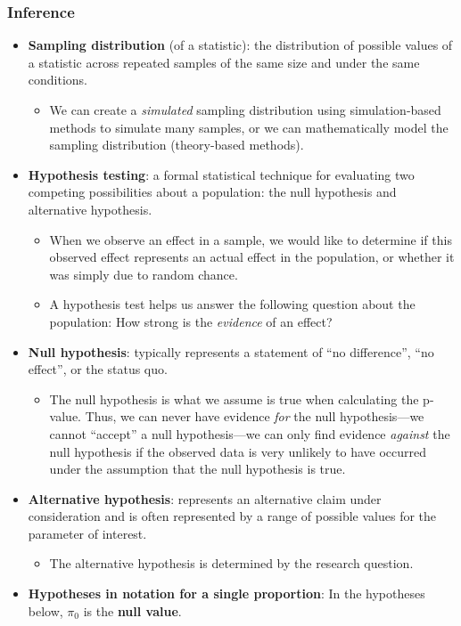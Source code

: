 \documentclass[
]{report}
\providecommand{\tightlist}{%
  \setlength{\itemsep}{0pt}\setlength{\parskip}{0pt}}
\begin{document}
\subsubsection*{Inference}\label{inference}

\begin{itemize}
\item
  \textbf{Sampling distribution} (of a statistic): the distribution of possible values of a statistic across repeated samples of the same size and under the same conditions.

  \begin{itemize}
  \tightlist
  \item
    We can create a \emph{simulated} sampling distribution using simulation-based methods to simulate many samples, or we can mathematically model the sampling distribution (theory-based methods).
  \end{itemize}
\item
  \textbf{Hypothesis testing}: a formal statistical technique for evaluating two competing possibilities about a population: the null hypothesis and alternative hypothesis.

  \begin{itemize}
  \item
    When we observe an effect in a sample, we would like to determine if this observed effect represents an actual effect in the population, or whether it was simply due to random chance.
  \item
    A hypothesis test helps us answer the following question about the population: How strong is the \emph{evidence} of an effect?
  \end{itemize}
\item
  \textbf{Null hypothesis}: typically represents a statement of ``no difference'', ``no effect'', or the status quo.

  \begin{itemize}
  \tightlist
  \item
    The null hypothesis is what we assume is true when calculating the p-value. Thus, we can never have evidence \emph{for} the null hypothesis---we cannot ``accept'' a null hypothesis---we can only find evidence \emph{against} the null hypothesis if the observed data is very unlikely to have occurred under the assumption that the null hypothesis is true.
  \end{itemize}
\item
  \textbf{Alternative hypothesis}: represents an alternative claim under consideration and is often represented by a range of possible values for the parameter of interest.

  \begin{itemize}
  \tightlist
  \item
    The alternative hypothesis is determined by the research question.
  \end{itemize}
\item
  \textbf{Hypotheses in notation for a single proportion}: In the hypotheses below, \(\pi_0\) is the \textbf{null value}.
\end{itemize}
\end{document}
